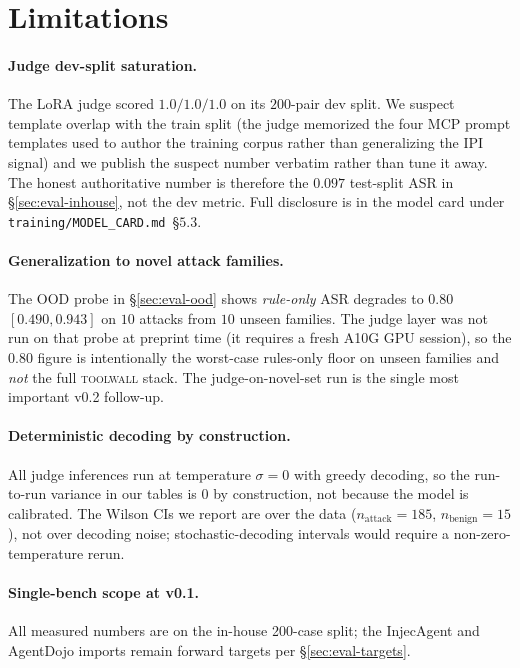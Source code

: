\section{Limitations}
\label{sec:limits}

\paragraph{Judge dev-split saturation.} The LoRA judge scored
$1.0/1.0/1.0$ on its $200$-pair dev split. We suspect template
overlap with the train split (the judge memorized the four MCP
prompt templates used to author the training corpus rather than
generalizing the IPI signal) and we publish the suspect number
verbatim rather than tune it away. The honest authoritative
number is therefore the $0.097$ test-split ASR in
\S\ref{sec:eval-inhouse}, not the dev metric. Full disclosure is
in the model card under
\verb|training/MODEL_CARD.md|~\S$5.3$.

\paragraph{Generalization to novel attack families.} The OOD
probe in \S\ref{sec:eval-ood} shows \emph{rule-only} ASR degrades
to $0.80$ $[0.490, 0.943]$ on $10$ attacks from $10$ unseen
families. The judge layer was not run on that probe at preprint
time (it requires a fresh A10G GPU session), so the $0.80$
figure is intentionally the worst-case rules-only floor on unseen
families and \emph{not} the full \textsc{toolwall} stack. The
judge-on-novel-set run is the single most important v0.2
follow-up.

\paragraph{Deterministic decoding by construction.} All judge
inferences run at temperature $\sigma=0$ with greedy decoding, so
the run-to-run variance in our tables is $0$ by construction, not
because the model is calibrated. The Wilson CIs we report are
over the data ($n_\text{attack}=185$, $n_\text{benign}=15$), not
over decoding noise; stochastic-decoding intervals would require
a non-zero-temperature rerun.

\paragraph{Single-bench scope at v0.1.} All measured numbers are
on the in-house 200-case split; the InjecAgent and AgentDojo
imports remain forward targets per \S\ref{sec:eval-targets}.

